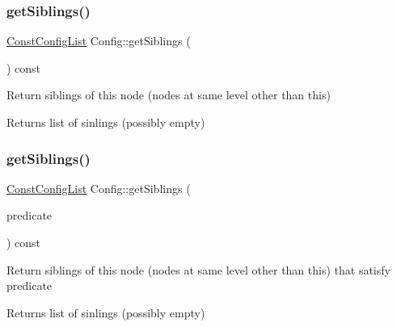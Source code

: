 \subsubsection{\texorpdfstring{get\+Siblings()}{getSiblings()}\hspace{0.1cm}{\footnotesize\ttfamily [1/2]}}
{\footnotesize\ttfamily \hyperlink{classtheoria_1_1config_1_1Config_a61230728ffa4d92667a536c8c0f0ca30}{Const\+Config\+List} Config\+::get\+Siblings (\begin{DoxyParamCaption}{ }\end{DoxyParamCaption}) const}

Return siblings of this node (nodes at same level other than this) \begin{DoxyReturn}{Returns}
list of sinlings (possibly empty) 
\end{DoxyReturn}
\mbox{\label{classtheoria_1_1config_1_1Config_abb60532c082c92c628ae49ed3b2e9457}} 
\subsubsection{\texorpdfstring{get\+Siblings()}{getSiblings()}\hspace{0.1cm}{\footnotesize\ttfamily [2/2]}}
{\footnotesize\ttfamily \hyperlink{classtheoria_1_1config_1_1Config_a61230728ffa4d92667a536c8c0f0ca30}{Const\+Config\+List} Config\+::get\+Siblings (\begin{DoxyParamCaption}\item[{const \hyperlink{classtheoria_1_1config_1_1Config_a293ebfd7146d935e232a066f7e6fa279}{Config\+Predicate} \&}]{predicate }\end{DoxyParamCaption}) const}

Return siblings of this node (nodes at same level other than this) that satisfy predicate \begin{DoxyReturn}{Returns}
list of sinlings (possibly empty) 
\end{DoxyReturn}
\mbox{\label{classtheoria_1_1config_1_1Config_a01d4128f1f86ad2ff01dfeb3c52c72f4}} 
